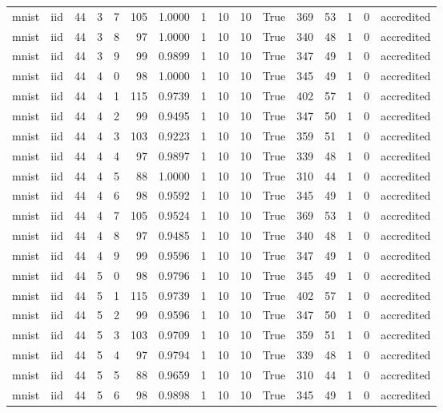 \begin{tabular}{llrrrrrrrrrrrrrl}
mnist & iid & 44 & 3 & 7 & 105 & 1.0000 & 1 & 10 & 10 & True & 369 & 53 & 1 & 0 & accredited \\
mnist & iid & 44 & 3 & 8 & 97 & 1.0000 & 1 & 10 & 10 & True & 340 & 48 & 1 & 0 & accredited \\
mnist & iid & 44 & 3 & 9 & 99 & 0.9899 & 1 & 10 & 10 & True & 347 & 49 & 1 & 0 & accredited \\
mnist & iid & 44 & 4 & 0 & 98 & 1.0000 & 1 & 10 & 10 & True & 345 & 49 & 1 & 0 & accredited \\
mnist & iid & 44 & 4 & 1 & 115 & 0.9739 & 1 & 10 & 10 & True & 402 & 57 & 1 & 0 & accredited \\
mnist & iid & 44 & 4 & 2 & 99 & 0.9495 & 1 & 10 & 10 & True & 347 & 50 & 1 & 0 & accredited \\
mnist & iid & 44 & 4 & 3 & 103 & 0.9223 & 1 & 10 & 10 & True & 359 & 51 & 1 & 0 & accredited \\
mnist & iid & 44 & 4 & 4 & 97 & 0.9897 & 1 & 10 & 10 & True & 339 & 48 & 1 & 0 & accredited \\
mnist & iid & 44 & 4 & 5 & 88 & 1.0000 & 1 & 10 & 10 & True & 310 & 44 & 1 & 0 & accredited \\
mnist & iid & 44 & 4 & 6 & 98 & 0.9592 & 1 & 10 & 10 & True & 345 & 49 & 1 & 0 & accredited \\
mnist & iid & 44 & 4 & 7 & 105 & 0.9524 & 1 & 10 & 10 & True & 369 & 53 & 1 & 0 & accredited \\
mnist & iid & 44 & 4 & 8 & 97 & 0.9485 & 1 & 10 & 10 & True & 340 & 48 & 1 & 0 & accredited \\
mnist & iid & 44 & 4 & 9 & 99 & 0.9596 & 1 & 10 & 10 & True & 347 & 49 & 1 & 0 & accredited \\
mnist & iid & 44 & 5 & 0 & 98 & 0.9796 & 1 & 10 & 10 & True & 345 & 49 & 1 & 0 & accredited \\
mnist & iid & 44 & 5 & 1 & 115 & 0.9739 & 1 & 10 & 10 & True & 402 & 57 & 1 & 0 & accredited \\
mnist & iid & 44 & 5 & 2 & 99 & 0.9596 & 1 & 10 & 10 & True & 347 & 50 & 1 & 0 & accredited \\
mnist & iid & 44 & 5 & 3 & 103 & 0.9709 & 1 & 10 & 10 & True & 359 & 51 & 1 & 0 & accredited \\
mnist & iid & 44 & 5 & 4 & 97 & 0.9794 & 1 & 10 & 10 & True & 339 & 48 & 1 & 0 & accredited \\
mnist & iid & 44 & 5 & 5 & 88 & 0.9659 & 1 & 10 & 10 & True & 310 & 44 & 1 & 0 & accredited \\
mnist & iid & 44 & 5 & 6 & 98 & 0.9898 & 1 & 10 & 10 & True & 345 & 49 & 1 & 0 & accredited \\

\end{tabular}
